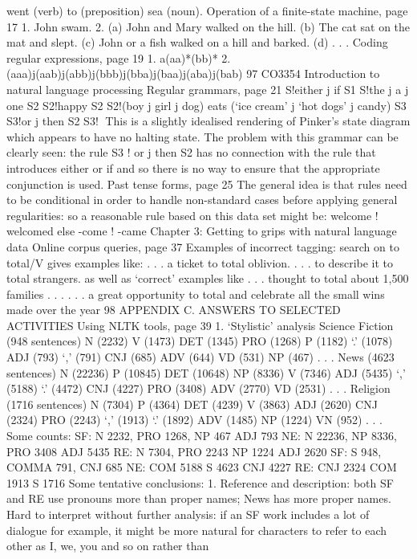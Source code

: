 went (verb) to (preposition) sea (noun).
Operation of a finite-state machine, page 17
1. John swam.
2. (a) John and Mary walked on the hill.
(b) The cat sat on the mat and slept.
(c) John or a fish walked on a hill and barked.
(d) . . .
Coding regular expressions, page 19
1. a(aa)*(bb)*
2. (aaa)j(aab)j(abb)j(bbb)j(bba)j(baa)j(aba)j(bab)
97
CO3354 Introduction to natural language processing
Regular grammars, page 21
S!either j if S1
S!the j a j one S2
S2!happy S2
S2!(boy j girl j dog) eats (‘ice cream’ j ‘hot dogs’ j candy) S3
S3!or j then S2
S3!
This is a slightly idealised rendering of Pinker’s state diagram which appears to have
no halting state.
The problem with this grammar can be clearly seen: the rule S3 ! or j then S2 has
no connection with the rule that introduces either or if and so there is no way to
ensure that the appropriate conjunction is used.
Past tense forms, page 25
The general idea is that rules need to be conditional in order to handle
non-standard cases before applying general regularities: so a reasonable rule based
on this data set might be:
welcome ! welcomed else
-come ! -came
Chapter 3: Getting to grips with natural language data
Online corpus queries, page 37
Examples of incorrect tagging: search on to total/V gives examples like:
. . . a ticket to total oblivion.
. . . to describe it to total strangers.
as well as ‘correct’ examples like
. . . thought to total about 1,500 families . . .
. . . a great opportunity to total and celebrate all the small wins made over the
year
98
APPENDIX C. ANSWERS TO SELECTED ACTIVITIES
Using NLTK tools, page 39
1. ‘Stylistic’ analysis
Science Fiction (948 sentences) N (2232) V (1473) DET (1345) PRO (1268) P
(1182) ‘.’ (1078) ADJ (793) ‘,’ (791) CNJ (685) ADV (644) VD (531) NP (467)
. . .
News (4623 sentences) N (22236) P (10845) DET (10648) NP (8336) V (7346)
ADJ (5435) ‘,’ (5188) ‘.’ (4472) CNJ (4227) PRO (3408) ADV (2770) VD (2531)
. . .
Religion (1716 sentences) N (7304) P (4364) DET (4239) V (3863) ADJ (2620)
CNJ (2324) PRO (2243) ‘,’ (1913) ‘.’ (1892) ADV (1485) NP (1224) VN (952)
. . .
Some counts:
SF: N 2232, PRO 1268, NP 467 ADJ 793
NE: N 22236, NP 8336, PRO 3408 ADJ 5435
RE: N 7304, PRO 2243 NP 1224 ADJ 2620
SF: S 948, COMMA 791, CNJ 685
NE: COM 5188 S 4623 CNJ 4227
RE: CNJ 2324 COM 1913 S 1716
Some tentative conclusions:
1. Reference and description: both SF and RE use pronouns more than proper
names; News has more proper names. Hard to interpret without further
analysis: if an SF work includes a lot of dialogue for example, it might be more
natural for characters to refer to each other as I, we, you and so on rather than
